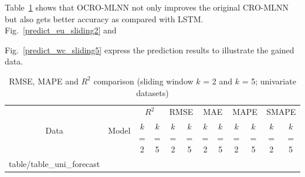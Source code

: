 \documentclass[smallcondensed, natbib]{svjour3}     %
\makeatletter
\newcommand\primitiveinput[1]
		{\@@input #1 }
\makeatother
\begin{document}
Table~\ref{table:uni_forecast} shows that OCRO-MLNN not only improves the original CRO-MLNN but also gets better accuracy as compared with LSTM. Fig.~\ref{predict_eu_sliding2} and {Fig.~\ref{predict_wc_sliding5} express the prediction results to illustrate the gained data. 

\begin{table}[!h]
	\caption{RMSE, MAPE and $R^2$ comparison (sliding window $k$ = 2 and $k$ = 5; univariate datasets)}
	\label{table:uni_forecast}
	\centering
	\begin{adjustbox}{width=\textwidth}
		\begin{tabular}{| c | c | c | c | c | c | c | c | c | c | c | c |}%
			\hline
			\multirow{2}{*}{Data} & \multirow{2}{*}{Model} & \multicolumn{2}{c|}{$R^2$} & \multicolumn{2}{c|}{RMSE} & \multicolumn{2}{c|}{MAE} & \multicolumn{2}{c|}{MAPE}  & \multicolumn{2}{c|}{SMAPE} \\ \cline{3-12}
   				& & $k$ = 2 & $k$ = 5 & $k$ = 2 & $k$ = 5 & $k$ = 2 & $k$ = 5 & $k$ = 2 & $k$ = 5 & $k$ = 2 & $k$ = 5 \\ [0.5ex] 
			\hline
			\primitiveinput{table/table_uni_forecast}
			\hline
		\end{tabular}
	\end{adjustbox}
\end{table}



}
\end{document}
